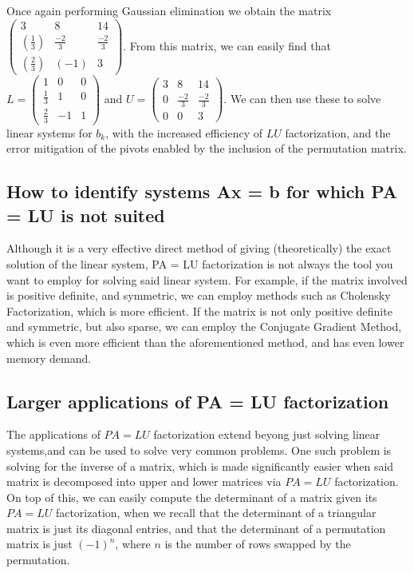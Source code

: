 \documentclass[11pt]{article}
\begin{document}
Once again performing Gaussian elimination we obtain the matrix $\begin{pmatrix}3&8&14\\(\frac{1}{3})&\frac{-2}{3}&\frac{-2}{3}\\(\frac{2}{3})&(-1)&3
\end{pmatrix}$.
From this matrix, we can easily find that $L = \begin{pmatrix}1&0&0\\\frac{1}{3}&1&0\\\frac{2}{3}&-1&1
\end{pmatrix}$ and $U = \begin{pmatrix}3&8&14\\0&\frac{-2}{3}&\frac{-2}{3}\\0&0&3
\end{pmatrix}$.
We can then use these to solve linear systems for $b_k$, with the increased efficiency of $LU$ factorization, and the error mitigation of the pivots enabled by the inclusion of the permutation matrix.\\


\subsection{How to identify systems Ax = b for which PA = LU is not suited}
Although it is a very effective direct method of giving (theoretically) the exact solution of the linear system, PA = LU factorization is not always the tool you want to employ for solving said linear system.
For example, if the matrix involved is positive definite, and symmetric, we can employ methods such as Cholensky Factorization, which is more efficient.
If the matrix is not only positive definite and symmetric, but also sparse, we can employ the Conjugate Gradient Method, which is even more efficient than the aforementioned method, and has even lower memory demand.

\subsection{Larger applications of PA = LU factorization}
The applications of $PA = LU$ factorization extend beyong just solving linear systems,and can be used to solve very common problems.
One such problem is solving for the inverse of a matrix, which is made significantly easier when said matrix is decomposed into upper and lower matrices via $PA = LU$ factorization.
On top of this, we can easily compute the determinant of a matrix given its $PA = LU$ factorization, when we recall that the determinant of a triangular matrix is just its diagonal entries, and that the determinant of a permutation matrix is just $(-1)^n$, where $n$ is the number of rows swapped by the permutation.
\end{document}
